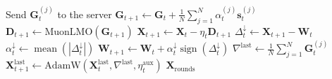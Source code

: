 \documentclass[letterpaper]{article} %
\begin{document}
\begin{algorithm}[!t]
\begin{algorithmic}[1]
            \State Send $\mathbf{G}_t^{(j)}$ to the server
        \EndFor
    \EndFor
    \State $\mathbf{G}_{t+1} \gets \mathbf{G}_t + \frac{1}{N} \sum_{j=1}^N \alpha_t^{(j)} \mathbf{s}_t^{(j)}$ 
        \State $\mathbf{D}_{t+1} \gets \mathrm{MuonLMO}(\mathbf{G}_{t+1})$
        \State $\mathbf{X}_{t+1} \gets \mathbf{X}_t - \eta_t \mathbf{D}_{t+1}$
        \State $\Delta_t^{\downarrow} \gets \mathbf{X}_{t+1} - \mathbf{W}_t$ 
        \State $\alpha_t^{\downarrow} \gets \operatorname{mean}(|\Delta_t^{\downarrow}|)$
        \State $\mathbf{W}_{t+1} \gets \mathbf{W}_t + \alpha_t^{\downarrow}\operatorname{sign}(\Delta_t^{\downarrow})$
    \EndFor
    \State $\nabla^{\text{last}} \gets \frac{1}{N} \sum_{j=1}^N \mathbf{G}_t^{(j)}$
    \State $\mathbf{X}_{t+1}^{\text{last}} \gets \text{AdamW}(\mathbf{X}_t^{\text{last}}, \nabla^{\text{last}}, \eta_t^{\text{aux}})$ 
\EndFor
\State \Return $\mathbf{X}_{\mathrm{rounds}}$
\end{algorithmic}
\end{algorithm}



\end{document}
